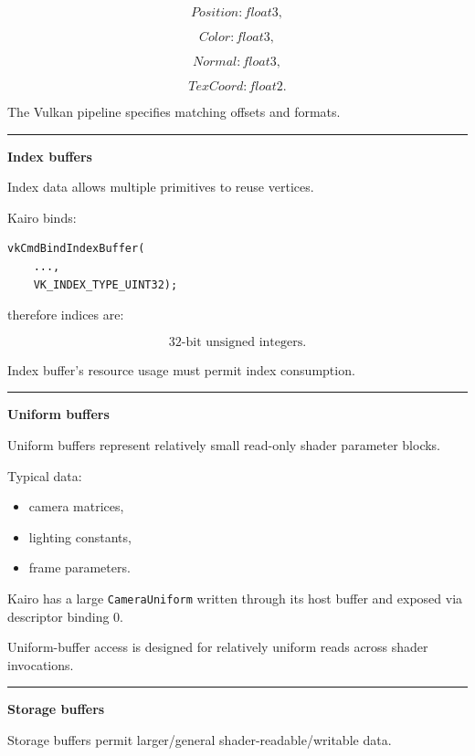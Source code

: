 \[
Position:float3,
\]

\[
Color:float3,
\]

\[
Normal:float3,
\]

\[
TexCoord:float2.
\]

The Vulkan pipeline specifies matching offsets and formats.

\begin{center}\rule{0.5\linewidth}{0.5pt}\end{center}

\textbf{Index buffers}

Index data allows multiple primitives to reuse vertices.

Kairo binds:

\begin{verbatim}
vkCmdBindIndexBuffer(
    ...,
    VK_INDEX_TYPE_UINT32);
\end{verbatim}

therefore indices are:

\[
32\text{-bit unsigned integers}.
\]

Index buffer's resource usage must permit index consumption.

\begin{center}\rule{0.5\linewidth}{0.5pt}\end{center}

\textbf{Uniform buffers}

Uniform buffers represent relatively small read-only shader parameter blocks.

Typical data:

\begin{itemize}
\tightlist
\item
  camera matrices,
\item
  lighting constants,
\item
  frame parameters.
\end{itemize}

Kairo has a large \texttt{CameraUniform} written through its host buffer and exposed via descriptor binding 0.

Uniform-buffer access is designed for relatively uniform reads across shader invocations.

\begin{center}\rule{0.5\linewidth}{0.5pt}\end{center}

\textbf{Storage buffers}

Storage buffers permit larger/general shader-readable/writable data.


